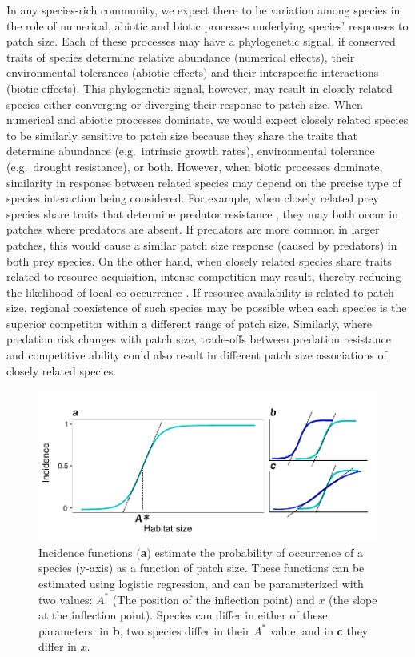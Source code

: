 In any species-rich community, we expect there to be variation among
species in the role of numerical, abiotic and biotic processes
underlying species' responses to patch size. Each of these processes may
have a phylogenetic signal, if conserved traits of species determine
relative abundance (numerical effects), their environmental tolerances
(abiotic effects) and their interspecific interactions (biotic effects).
This phylogenetic signal, however, may result in closely related species
either converging or diverging their response to patch size. When
numerical and abiotic processes dominate, we would expect closely
related species to be similarly sensitive to patch size because they
share the traits that determine abundance (e.g.~intrinsic growth rates),
environmental tolerance (e.g.~drought resistance), or both. However,
when biotic processes dominate, similarity in response between related
species may depend on the precise type of species interaction being
considered. For example, when closely related prey species share traits
that determine predator resistance \citep{Nyman2007}, they may both
occur in patches where predators are absent. If predators are more
common in larger patches, this would cause a similar patch size response
(caused by predators) in both prey species. On the other hand, when
closely related species share traits related to resource acquisition,
intense competition may result, thereby reducing the likelihood of local
co-occurrence \citep{Webb2002}. If resource availability is related to
patch size, regional coexistence of such species may be possible when
each species is the superior competitor within a different range of
patch size. Similarly, where predation risk changes with patch size,
trade-offs between predation resistance and competitive ability could
also result in different patch size associations of closely related
species.

\begin{figure}[htbp]
\centering
\includegraphics[width=5.5in]{figures/illustration.pdf}
\caption[Conceptual diagram of incidence functions]{Incidence functions (\textbf{a}) estimate the probability of
occurrence of a species (y-axis) as a function of patch size. These
functions can be estimated using logistic regression, and can be
parameterized with two values: \(A^{*}\) (The position of the inflection
point) and \(x\) (the slope at the inflection point). Species can differ
in either of these parameters: in \textbf{b}, two species differ in
their \(A^{*}\) value, and in \textbf{c} they differ in \(x\).}
\label{fig:concept}
\end{figure}

